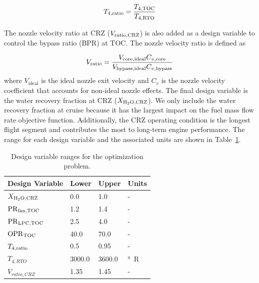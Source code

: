 \documentclass[conf]{new-aiaa}
\begin{document}
\begin{equation}
    T_{4,\rm{ratio}} = \frac{T_{4,\rm{TOC}}}{T_{4,\rm{RTO}}}
    \label{t4ratio}
\end{equation}

\noindent
The nozzle velocity ratio at CRZ ($V_{\rm{ratio,CRZ}}$) is also added as a design variable to control the bypass ratio (BPR) at TOC.
The nozzle velocity ratio is defined as

\begin{equation}
    V_{\rm{ratio}} = \frac{V_{\rm{core,ideal}}C_{v,\rm{core}}}{V_{\rm{bypass,ideal}}C_{v,\rm{bypass}}}
    \label{eq:vratio}
\end{equation}
where $V_\text{ideal}$ is the ideal nozzle exit velocity and $C_v$ is the nozzle velocity coefficient that accounts for non-ideal nozzle effects.
The final design variable is the water recovery fraction at CRZ ($X_{\rm{H_2O,CRZ}}$).
We only include the water recovery fraction at cruise because it has the largest impact on the fuel mass flow rate objective function.
Additionally, the CRZ operating condition is the longest flight segment and contributes the most to long-term engine performance.
The range for each design variable and the associated units are shown in Table~\ref{tab:dv_table}.
\begin{table}[hbt!]
    \centering
    \caption{Design variable ranges for the optimization problem.
    }
    \small
    \renewcommand{\arraystretch}{1.2}
    \begin{tabular}{l l l l}
        Design Variable          & Lower  & Upper  & Units            \\
        \toprule
        $X_{\rm{H_2O,CRZ}}$      & 0.0    & 1.0    & -                \\
        $\rm{PR}_{\rm{fan,TOC}}$ & 1.2    & 1.4    & -                \\
        $\rm{PR}_{\rm{LPC,TOC}}$ & 2.5    & 4.0    & -                \\
        $\rm{OPR}_{\rm{TOC}}$    & 40.0   & 70.0   & -                \\
        $T_{4,\rm{ratio}}$       & 0.5    & 0.95   & -                \\
        $T_{4,RTO}$              & 3000.0 & 3600.0 & \unit{\degree R} \\
        $V_{ratio,CRZ}$          & 1.35   & 1.45   & -                \\
        \bottomrule
    \end{tabular}
    \label{tab:dv_table}
\end{table}
\end{document}
